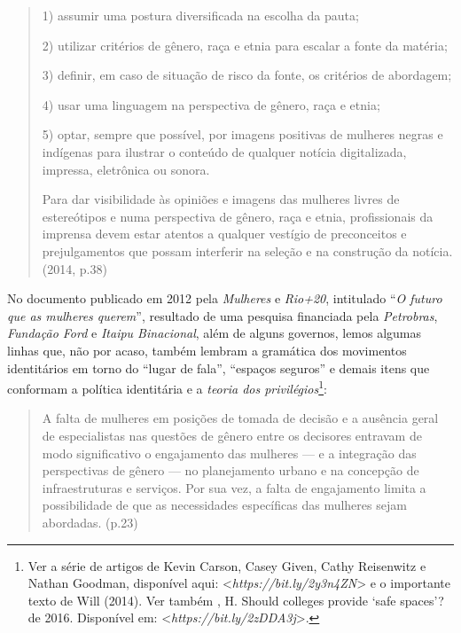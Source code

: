 \begin{quote}
1) assumir uma postura diversificada na escolha da pauta;

2) utilizar critérios de gênero, raça e etnia para escalar a fonte da
matéria;

3) definir, em caso de situação de risco da fonte, os critérios de
abordagem;

4) usar uma linguagem na perspectiva de gênero, raça e etnia;

5) optar, sempre que possível, por imagens positivas de mulheres negras
e indígenas para ilustrar o conteúdo de qualquer notícia digitalizada,
impressa, eletrônica ou sonora.

Para dar visibilidade às opiniões e imagens das mulheres livres de
estereótipos e numa perspectiva de gênero, raça e etnia, profissionais
da imprensa devem estar atentos a qualquer vestígio de preconceitos e
prejulgamentos que possam interferir na seleção e na construção da
notícia. (2014, p.38)
\end{quote}

No documento publicado em 2012 pela \emph{ Mulheres} e \emph{Rio+20},
intitulado ``\emph{O futuro que as mulheres querem}'', resultado de uma
pesquisa financiada pela \emph{Petrobras}, \emph{Fundação Ford} e
\emph{Itaipu Binacional}, além de alguns governos, lemos algumas linhas
que, não por acaso, também lembram a gramática dos movimentos
identitários em torno do ``lugar de fala'', ``espaços seguros'' e demais
itens que conformam a política identitária e a \emph{teoria dos
privilégios}\footnote{Ver a série de artigos de Kevin Carson, Casey
  Given, Cathy Reisenwitz e Nathan Goodman, disponível aqui:
  \textless{}\emph{https://bit.ly/2y3n4ZN}\textgreater{} e o
  importante texto de Will (2014). Ver também , H. Should
  colleges provide `safe spaces'? de 2016. Disponível em:
  \textless{}\emph{https://bit.ly/2zDDA3j}\textgreater{}.}:

\begin{quote}
A falta de mulheres em posições de tomada de decisão e a ausência geral
de especialistas nas questões de gênero entre os decisores entravam de
modo significativo o engajamento das mulheres --- e a integração das
perspectivas de gênero --- no planejamento urbano e na concepção de
infraestruturas e serviços. Por sua vez, a falta de engajamento limita a
possibilidade de que as necessidades específicas das mulheres sejam
abordadas. (p.23)
\end{quote}

